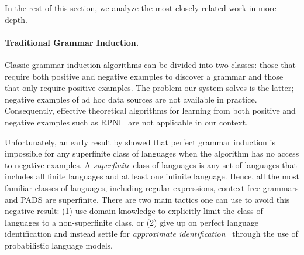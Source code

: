 \noindent
In the rest of this section, we analyze
the most closely related work in more depth.

\paragraph*{Traditional Grammar Induction.}
Classic grammar induction algorithms \cite{vidal:gisurvey} 
can be divided into two classes: those that require both
positive and negative examples to discover a grammar and those that
only require positive examples. The problem our system solves is the latter;
negative examples of ad hoc data sources are not available in
practice.  Consequently, effective theoretical algorithms for learning
from both positive and negative
examples such as RPNI~\cite{rpni}
are not applicable in our context.

Unfortunately, an early result by \citet{gold:inference} showed
that perfect grammar induction is impossible for any superfinite class
of languages when the algorithm has no access to negative examples.  A
{\em superfinite} class of languages is any set of languages that
includes all finite languages and at least one infinite
language. Hence, all the most familiar classes of languages, including
regular expressions, context free grammars and PADS are superfinite.
There are two main tactics one can use to avoid this negative
result: 
(1) use domain knowledge to explicitly limit the class of languages to a
non-superfinite class, or
(2) give up on perfect language identification and instead settle for {\em approximate
identification}~\cite{wharton:approximate-language-identification}
through the use of probabilistic language models.

